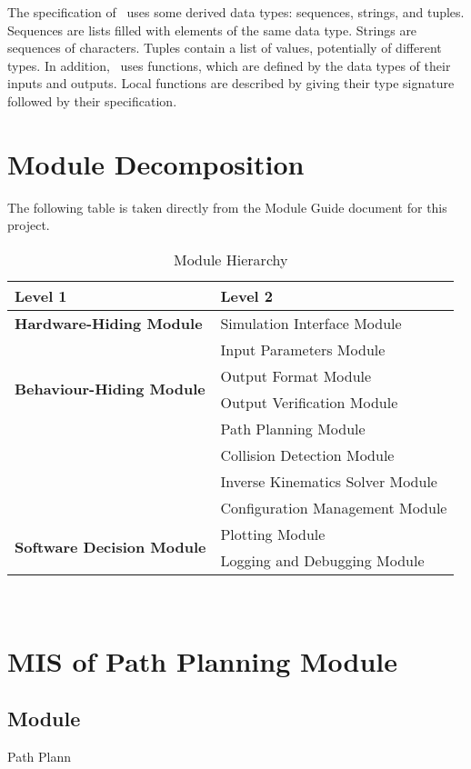 \documentclass[12pt, titlepage]{article}
\begin{document}
\noindent
The specification of \progname \ uses some derived data types: sequences, strings, and
tuples. Sequences are lists filled with elements of the same data type. Strings
are sequences of characters. Tuples contain a list of values, potentially of
different types. In addition, \progname \ uses functions, which
are defined by the data types of their inputs and outputs. Local functions are
described by giving their type signature followed by their specification.

\section{Module Decomposition}

The following table is taken directly from the Module Guide document for this project.


\begin{table}[h!]
  \centering
  \begin{tabular}{p{} p{}}
  \toprule
  \textbf{Level 1} & \textbf{Level 2}\\
  \midrule
  \textbf{Hardware-Hiding Module} & Simulation Interface Module\\
  \midrule
  \multirow{4}{0.3\textwidth}{\textbf{Behaviour-Hiding Module}} 
  & Input Parameters Module \\
  & Output Format Module \\
  & Output Verification Module \\
  & Path Planning Module \\
  & Collision Detection Module \\
  & Inverse Kinematics Solver Module \\
  & Configuration Management Module \\
  \midrule
  \multirow{3}{0.3\textwidth}{\textbf{Software Decision Module}} 
  & Plotting Module \\
  & Logging and Debugging Module \\
  \bottomrule
  \end{tabular}
  \caption{Module Hierarchy}
  \label{TblMH}
  \end{table}


\newpage
~\newpage

\section{MIS of Path Planning Module} \label{Module:PathPlanning}

\subsection{Module}
Path Plann
\end{document}
